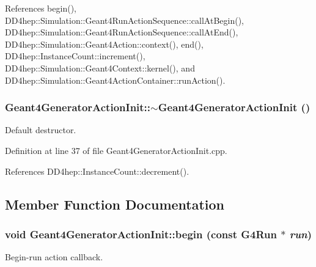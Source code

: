 References begin(), DD4hep::Simulation::Geant4RunActionSequence::callAtBegin(), DD4hep::Simulation::Geant4RunActionSequence::callAtEnd(), DD4hep::Simulation::Geant4Action::context(), end(), DD4hep::InstanceCount::increment(), DD4hep::Simulation::Geant4Context::kernel(), and DD4hep::Simulation::Geant4ActionContainer::runAction().\hypertarget{class_d_d4hep_1_1_simulation_1_1_geant4_generator_action_init_a8e406b069d1024eb9891cbb979c5a734}{
\subsubsection[{$\sim$Geant4GeneratorActionInit}]{\setlength{\rightskip}{0pt plus 5cm}Geant4GeneratorActionInit::$\sim$Geant4GeneratorActionInit ()}}
\label{class_d_d4hep_1_1_simulation_1_1_geant4_generator_action_init_a8e406b069d1024eb9891cbb979c5a734}


Default destructor. 

Definition at line 37 of file Geant4GeneratorActionInit.cpp.

References DD4hep::InstanceCount::decrement().

\subsection{Member Function Documentation}
\hypertarget{class_d_d4hep_1_1_simulation_1_1_geant4_generator_action_init_a7f4d99a8f94977444775eabea8080868}{
\subsubsection[{begin}]{\setlength{\rightskip}{0pt plus 5cm}void Geant4GeneratorActionInit::begin (const G4Run $\ast$ {\em run})}}
\label{class_d_d4hep_1_1_simulation_1_1_geant4_generator_action_init_a7f4d99a8f94977444775eabea8080868}


Begin-\/run action callback. 

